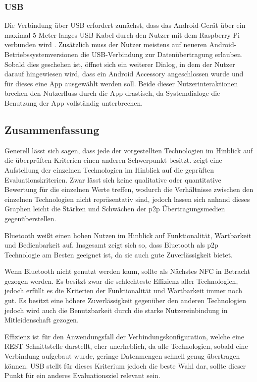           \subsubsection{USB} Die Verbindung über USB erfordert zunächst, dass das Android-Gerät über ein \linebreak maximal 5 Meter langes USB Kabel durch den Nutzer mit dem Raspberry Pi verbunden wird \cite[S.22]{Kelm}. Zusätzlich muss der Nutzer meistens auf neueren Android-Betriebssystemversionen die USB-Verbindung zur Datenübertragung erlauben. Sobald dies geschehen ist, öffnet sich ein weiterer Dialog, in dem der Nutzer darauf hingewiesen wird, dass ein Android Accessory angeschlossen wurde und für dieses  eine App ausgewählt werden soll. Beide dieser Nutzerinteraktionen brechen den Nutzerfluss durch die App drastisch, da Systemdialoge die Benutzung der App vollständig unterbrechen.
		
		\subsection{Zusammenfassung}
		Generell lässt sich sagen, dass jede der vorgestellten Technologien im Hinblick auf die überprüften Kriterien einen anderen Schwerpunkt besitzt.  zeigt eine Aufstellung der einzelnen Technologien im Hinblick auf die geprüften Evaluationskriterien. Zwar lässt sich keine qualitative oder quantitative Bewertung für die einzelnen Werte treffen, wodurch die Verhältnisse zwischen den einzelnen Technologien nicht repräsentativ sind, jedoch lassen sich anhand dieses Graphen leicht die Stärken und Schwächen der p2p Übertragungsmedien gegenüberstellen.
		
		Bluetooth weißt einen hohen Nutzen im Hinblick auf Funktionalität, Wartbarkeit und Bedienbarkeit auf. Insgesamt zeigt sich so, dass Bluetooth als p2p Technologie am Besten geeignet ist, da sie auch gute Zuverlässigkeit bietet.
		
		Wenn Bluetooth nicht genutzt werden kann, sollte als Nächstes NFC in Betracht gezogen werden. Es besitzt zwar die schlechteste Effizienz aller Technologien, jedoch erfüllt es die Kriterien der Funktionalität und Wartbarkeit immer noch gut. Es besitzt eine höhere Zuverlässigkeit gegenüber den anderen Technologien jedoch wird auch die Benutzbarkeit durch die starke Nutzereinbindung in Mitleidenschaft gezogen.
		
		Effizienz ist für den Anwendungsfall der Verbindungskonfiguration, welche eine REST-Schnittstelle darstellt, eher unerheblich, da alle Technologien, sobald eine Verbindung aufgebaut wurde, geringe Datenmengen schnell genug übertragen können. USB stellt für dieses Kriterium jedoch die beste Wahl dar, sollte dieser Punkt für ein anderes Evaluationsziel relevant sein.
		
